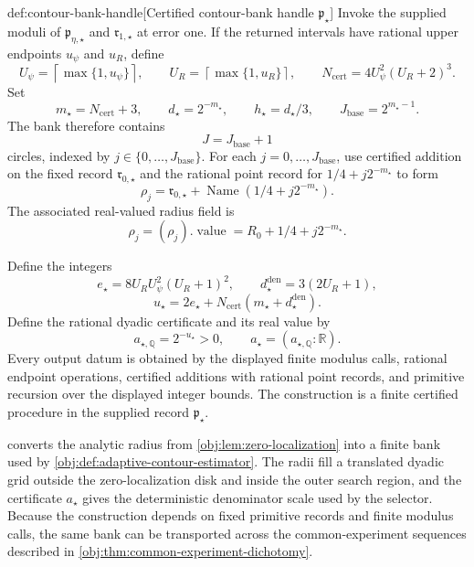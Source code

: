 \documentclass[11pt]{article}
\begin{document}
\begin{definitionv}{def:contour-bank-handle}[Certified contour-bank handle $\mathfrak p_{\star}$]
Invoke the supplied moduli of \(\mathfrak p_{\eta,\star}\) and \(\mathfrak r_{1,\star}\) at error one. If the returned intervals have rational upper endpoints \(u_{\psi}\) and \(u_R\), define
\[
 U_{\psi}=\left\lceil\max\{1,u_{\psi}\}\right\rceil,
 \qquad
 U_R=\left\lceil\max\{1,u_R\}\right\rceil,
 \qquad
 N_{\mathrm{cert}}=4U_{\psi}^2(U_R+2)^3.
\]
Set
\[
 m_{\star}=N_{\mathrm{cert}}+3,
 \qquad d_{\star}=2^{-m_{\star}},
 \qquad h_{\star}=d_{\star}/3,
 \qquad J_{\mathrm{base}}=2^{m_{\star}-1}.
\]
The bank therefore contains
\[
 J=J_{\mathrm{base}}+1
\]
circles, indexed by \(j\in\{0,\ldots,J_{\mathrm{base}}\}\).
For each \(j=0,\ldots,J_{\mathrm{base}}\), use certified addition on the fixed record \(\mathfrak r_{0,\star}\) and the rational point record for \(1/4+j2^{-m_{\star}}\) to form
\[
 \mathfrak\rho_j
 =\mathfrak r_{0,\star}+\operatorname{Name}(1/4+j2^{-m_{\star}}).
\]
The associated real-valued radius field is
\[
 \rho_j=(\mathfrak\rho_j).\operatorname{value}
       =R_0+1/4+j2^{-m_{\star}}.
\]

Define the integers
\[
 e_{\star}=8U_RU_{\psi}^2(U_R+1)^2,
 \qquad
 d_{\star}^{\mathrm{den}}=3(2U_R+1),
\]
\[
 u_{\star}=2e_{\star}
 +N_{\mathrm{cert}}(m_{\star}+d_{\star}^{\mathrm{den}}).
\]
Define the rational dyadic certificate and its real value by
\[
 a_{\star,\mathbb Q}=2^{-u_{\star}}>0,
 \qquad
 a_{\star}=(a_{\star,\mathbb Q}:\mathbb R).
\]
Every output datum is obtained by the displayed finite modulus calls, rational endpoint operations, certified additions with rational point records, and primitive recursion over the displayed integer bounds. The construction is a finite certified procedure in the supplied record \(\mathfrak p_{\star}\).
\end{definitionv}

 converts the analytic radius from \cref{obj:lem:zero-localization} into a finite bank used by \cref{obj:def:adaptive-contour-estimator}. The radii fill a translated dyadic grid outside the zero-localization disk and inside the outer search region, and the certificate \(a_{\star}\) gives the deterministic denominator scale used by the selector. Because the construction depends on fixed primitive records and finite modulus calls, the same bank can be transported across the common-experiment sequences described in \cref{obj:thm:common-experiment-dichotomy}.
\end{document}
